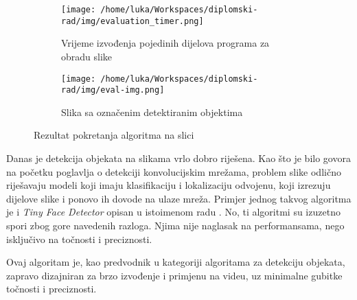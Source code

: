\begin{figure}[htp]
	\centering
	\begin{subfigure}[b]{0.7\linewidth}
		\texttt{[image: /home/luka/Workspaces/diplomski-rad/img/evaluation\_timer.png]}
		\caption{Vrijeme izvođenja pojedinih dijelova programa za obradu slike}
		\label{img:img-performance-terminal}
	\end{subfigure}
	\begin{subfigure}[b]{0.7\linewidth}
		\texttt{[image: /home/luka/Workspaces/diplomski-rad/img/eval-img.png]}
		\caption{Slika sa označenim detektiranim objektima}
		\label{img:img-result}
	\end{subfigure}
	\caption{Rezultat pokretanja algoritma na slici}
	\label{img:img-performance}
\end{figure}

Danas je detekcija objekata na slikama vrlo dobro riješena. Kao što je bilo govora na početku poglavlja o detekciji konvolucijskim mrežama, problem slike odlično riješavaju modeli koji imaju klasifikaciju i lokalizaciju odvojenu, koji izrezuju dijelove slike i ponovo ih dovode na ulaze mreža. Primjer jednog takvog algoritma je i \textit{Tiny Face Detector} opisan u istoimenom radu \citep{TinyFaceDetector}. No, ti algoritmi su izuzetno spori zbog gore navedenih razloga. Njima nije naglasak na performansama, nego isključivo na točnosti i preciznosti.

Ovaj algoritam je, kao predvodnik u kategoriji algoritama za detekciju objekata, zapravo dizajniran za brzo izvođenje i primjenu na videu, uz minimalne gubitke točnosti i preciznosti. 

